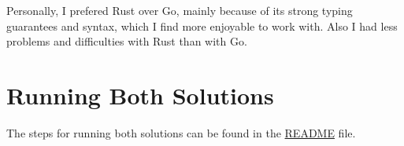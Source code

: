 \documentclass[a4paper]{article}
\begin{document}
Personally, I prefered Rust over Go, mainly because of its strong typing guarantees and syntax, which I find more enjoyable to work with. Also I had less problems and difficulties with Rust than with Go.

\section{Running Both Solutions}

The steps for running both solutions can be found in the \href{../README.md}{README} file.
\end{document}
